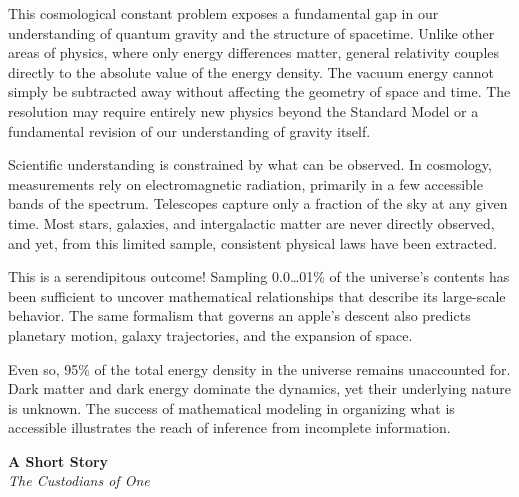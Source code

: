 This cosmological constant problem exposes a fundamental gap in our understanding of quantum gravity and the structure of spacetime. Unlike other areas of physics, where only energy differences matter, general relativity couples directly to the absolute value of the energy density. The vacuum energy cannot simply be subtracted away without affecting the geometry of space and time. The resolution may require entirely new physics beyond the Standard Model or a fundamental revision of our understanding of gravity itself.

\begin{commentary}
Scientific understanding is constrained by what can be observed. In cosmology, measurements rely on electromagnetic radiation, primarily in a few accessible bands of the spectrum. Telescopes capture only a fraction of the sky at any given time. Most stars, galaxies, and intergalactic matter are never directly observed, and yet, from this limited sample, consistent physical laws have been extracted.

This is a serendipitous outcome! Sampling 0.0\ldots01\% of the universe's contents has been sufficient to uncover mathematical relationships that describe its large-scale behavior. The same formalism that governs an apple's descent also predicts planetary motion, galaxy trajectories, and the expansion of space.

Even so, 95\% of the total energy density in the universe remains unaccounted for. Dark matter and dark energy dominate the dynamics, yet their underlying nature is unknown. The success of mathematical modeling in organizing what is accessible illustrates the reach of inference from incomplete information.

\end{commentary}

\newpage
\thispagestyle{empty}

\begin{center}
\vspace*{1cm}
{\Large\textbf{A Short Story}}\\[0.5cm]
{\large\textit{The Custodians of One}}
\vspace{0.5cm}
\end{center}

